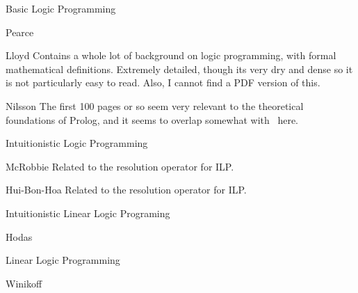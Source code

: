 \begin{pgroup}{Basic Logic Programming}
  \begin{paper}{Pearce}
    \mustread
  \end{paper}

  \begin{paper}{Lloyd}
    Contains a whole lot of background on logic programming, with formal mathematical definitions.
    Extremely detailed, though its very dry and dense so it is not particularly easy to read.
    Also, I cannot find a PDF version of this.

    \mustread
  \end{paper}

  \begin{paper}{Nilsson}
    The first 100 pages or so seem very relevant to the theoretical foundations of Prolog, and it seems to overlap somewhat with~\cite{Lloyd} here.

    \mustread
  \end{paper}
\end{pgroup}

\begin{pgroup}{Intuitionistic Logic Programming}
  \begin{paper}{McRobbie}
    Related to the resolution operator for ILP.
    \mustread
  \end{paper}

  \begin{paper}{Hui-Bon-Hoa}
    Related to the resolution operator for ILP.
    \mustread
  \end{paper}
\end{pgroup}

\begin{pgroup}{Intuitionistic Linear Logic Programing}
  \begin{paper}{Hodas}
    \mustread
  \end{paper}
\end{pgroup}

\begin{pgroup}{Linear Logic Programming}
  \begin{paper}{Winikoff}
    \mustread
  \end{paper}
\end{pgroup}
